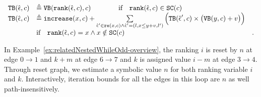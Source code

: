 \begin{defn}
{%
\[ 
\begin{array}{lll}
  {\ensuremath{\mathtt{TB}}}(\hat{\mathtt{\epsilon}{}}, c) 
  & \triangleq {\ensuremath{\mathtt{VB}}}(\mathtt{rank}(\hat{\mathtt{\epsilon}{}}, c), c)   \qquad \qquad  \text{if} \quad  \mathtt{rank}(\hat{\mathtt{\epsilon}{}}, c) \in \mathtt{SC}(c)  & \\
  {\mathtt{TB}}(\hat{\mathtt{\epsilon}{}}, c) 
  & \triangleq \mathtt{increase}(x, c) 
   + 
  \sum\limits_{\hat{\mathtt{\epsilon}{}}' \in \mathtt{re}(x, c) \land \hat{\mathtt{\epsilon}{}}' = (l, x \leq y + v, l') }
  \Big( {\mathtt{TB}}(\hat{\mathtt{\epsilon}{}}', c) \times \big( {\mathtt{VB}}(y, c) + v \big) \Big)
  & \\
  &  \text{if} \quad  \mathtt{rank}(\hat{\mathtt{\epsilon}{}}, c) = x \land x \notin \mathtt{SC}(c)  &.
\end{array}
  \]
}
\end{defn}
In Example~\ref{ex:relatedNestedWhileOdd-overview}, the ranking $i$ is reset by $n$ at edge $0 \to 1$ and 
$k + m$ at edge $6 \to 7$ and $k$ is assigned value $i - m$ at edge $3 \to 4$. Through reset graph, 
we estimate a symbolic value $n$ for both ranking variable $i$ and $k$.
Interactively, iteration bounds for all the edges in this loop are $n$ as well path-insensitively.
